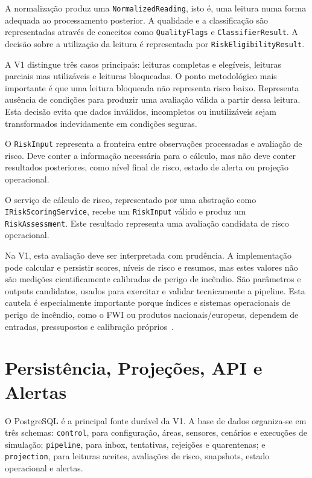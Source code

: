 A normalização produz uma \texttt{NormalizedReading}, isto é, uma leitura numa forma adequada ao processamento posterior. A qualidade e a classificação são representadas através de conceitos como \texttt{QualityFlags} e \texttt{ClassifierResult}. A decisão sobre a utilização da leitura é representada por \texttt{RiskEligibilityResult}.

A V1 distingue três casos principais: leituras completas e elegíveis, leituras parciais mas utilizáveis e leituras bloqueadas. O ponto metodológico mais importante é que uma leitura bloqueada não representa risco baixo. Representa ausência de condições para produzir uma avaliação válida a partir dessa leitura. Esta decisão evita que dados inválidos, incompletos ou inutilizáveis sejam transformados indevidamente em condições seguras.

O \texttt{RiskInput} representa a fronteira entre observações processadas e avaliação de risco. Deve conter a informação necessária para o cálculo, mas não deve conter resultados posteriores, como nível final de risco, estado de alerta ou projeção operacional.

O serviço de cálculo de risco, representado por uma abstração como \texttt{IRiskScoringService}, recebe um \texttt{RiskInput} válido e produz um \texttt{RiskAssessment}. Este resultado representa uma avaliação candidata de risco operacional.

Na V1, esta avaliação deve ser interpretada com prudência. A implementação pode calcular e persistir scores, níveis de risco e resumos, mas estes valores não são medições cientificamente calibradas de perigo de incêndio. São parâmetros e outputs candidatos, usados para exercitar e validar tecnicamente a pipeline. Esta cautela é especialmente importante porque índices e sistemas operacionais de perigo de incêndio, como o FWI ou produtos nacionais/europeus, dependem de entradas, pressupostos e calibração próprios~\citep{nrcan_fwi_system,ipma_fwi,ec_jrc_effis}.

\section{Persistência, Projeções, API e Alertas}

O PostgreSQL é a principal fonte durável da V1. A base de dados organiza-se em três schemas: \texttt{control}, para configuração, áreas, sensores, cenários e execuções de simulação; \texttt{pipeline}, para inbox, tentativas, rejeições e quarentenas; e \texttt{projection}, para leituras aceites, avaliações de risco, snapshots, estado operacional e alertas.

